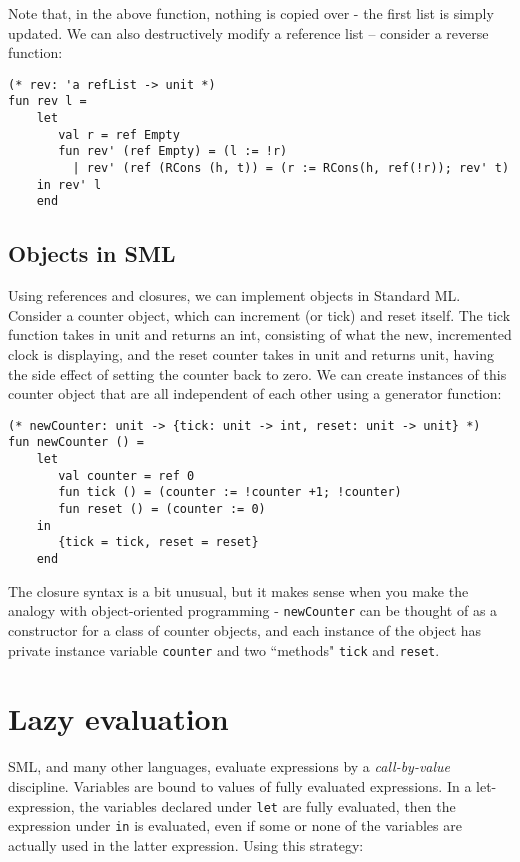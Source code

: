 \documentclass[11pt]{article}
\begin{document}
Note that, in the above function, nothing is copied over - the first list is simply updated. We can also destructively modify a reference list -- consider a reverse function:
\begin{verbatim}
(* rev: 'a refList -> unit *)
fun rev l =
    let
       val r = ref Empty
       fun rev' (ref Empty) = (l := !r)
         | rev' (ref (RCons (h, t)) = (r := RCons(h, ref(!r)); rev' t)
    in rev' l
    end
\end{verbatim}

\subsection{Objects in SML}

Using references and closures, we can implement objects in Standard ML. Consider a counter object, which can increment (or tick) and reset itself. The tick function takes in unit and returns an int, consisting of what the new, incremented clock is displaying, and the reset counter takes in unit and returns unit, having the side effect of setting the counter back to zero. We can create instances of this counter object that are all independent of each other using a generator function:
\begin{verbatim}
(* newCounter: unit -> {tick: unit -> int, reset: unit -> unit} *)
fun newCounter () = 
    let
       val counter = ref 0
       fun tick () = (counter := !counter +1; !counter)
       fun reset () = (counter := 0)
    in
       {tick = tick, reset = reset}
    end
\end{verbatim}

The closure syntax is a bit unusual, but it makes sense when you make the analogy with object-oriented programming - \verb~newCounter~ can be thought of as a constructor for a class of counter objects, and each instance of the object has private instance variable \verb~counter~ and two ``methods" \verb~tick~ and \verb~reset~.

\section{Lazy evaluation}

SML, and many other languages, evaluate expressions by a \emph{call-by-value} discipline. Variables are bound to values of fully evaluated expressions. In a let-expression, the variables declared under \verb~let~ are fully evaluated, then the expression under \verb~in~ is evaluated, even if some or none of the variables are actually used in the latter expression. Using this strategy:
\end{document}
